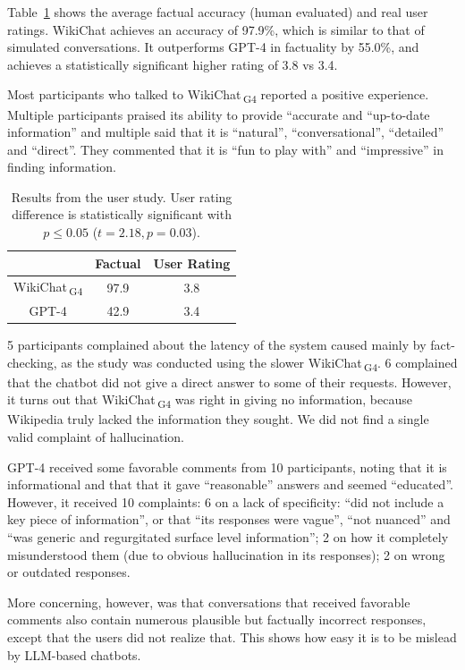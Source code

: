 \documentclass[11pt]{article}
\newcommand{\system}[0]{WikiChat\xspace}
\newcommand{\systemgf}[0]{WikiChat$\,$\textsubscript{G4}\xspace}
\begin{document}
Table~\ref{table:user_study} shows the average factual accuracy (human evaluated) and real user ratings. \system achieves an accuracy of 97.9\%, which is similar to that of simulated conversations. It outperforms GPT-4 in factuality by 55.0\%, and achieves a statistically significant higher rating of 3.8 vs 3.4. 


Most participants who talked to \systemgf reported a positive experience.
Multiple participants praised its ability to provide ``accurate and ``up-to-date information'' and multiple said that 
it is ``natural'', ``conversational'', ``detailed'' and ``direct''. They commented that it is ``fun to play with'' and ``impressive'' in finding information.

\begin{table}[t]
\centering
\small
\begin{tabular}{c c c}
 \hline
& Factual & User Rating \\
 \hline
\systemgf &  97.9 & 3.8 \\
GPT-4 &  42.9 & 3.4 \\
 \hline
\end{tabular}
\caption{Results from the user study. User rating difference is statistically significant with $p \leq 0.05$ ($t=2.18, p=0.03$).\vspace{-.5cm}}
\label{table:user_study}
\end{table}
5 participants complained about the latency of the system caused mainly by fact-checking, as the study was conducted using the slower \systemgf.
6 complained that the chatbot did not give a direct answer to some of their requests. However, it turns out that 
\systemgf was right in giving no information, because Wikipedia truly lacked the information they sought.
We did not find a single valid complaint of hallucination. 

GPT-4 received some favorable comments from 10 participants, noting that it is informational and that
that it gave
``reasonable'' answers and seemed ``educated''. However, it received 10 complaints: 6 on a lack of specificity: ``did not include a key piece of information'', or that ``its responses were vague'', ``not nuanced'' and ``was generic and regurgitated surface level information''; 2 on how it completely misunderstood them (due to obvious hallucination in its responses); 2 on wrong or outdated responses.

More concerning, however, was that conversations that received favorable comments also contain numerous plausible but factually incorrect responses, except that the users did not realize that. This shows how easy it is to be mislead by LLM-based chatbots.
\end{document}

